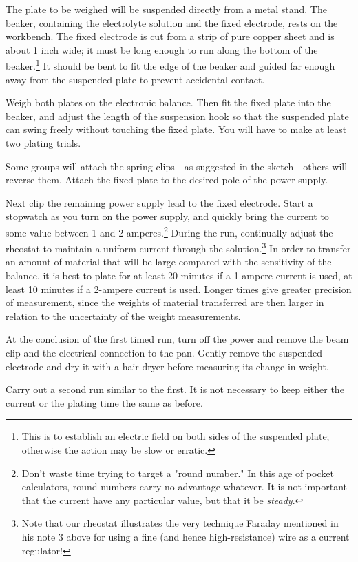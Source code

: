 The plate to be weighed will be suspended directly from a metal stand.
The beaker, containing the electrolyte solution and the fixed electrode,
rests on the workbench. The fixed electrode is cut from a strip of pure
copper sheet and is about 1 inch wide; it must be long enough to run
along the bottom of the beaker.\footnote{This is to establish an
  electric field on both sides of the suspended plate; otherwise the
  action may be slow or erratic.} It should be bent to fit the edge of
the beaker and guided far enough away from the suspended plate to
prevent accidental contact.

Weigh both plates on the electronic balance. Then fit the fixed plate
into the beaker, and adjust the length of the suspension hook so that
the suspended plate can swing freely without touching the fixed plate.
You will have to make at least two plating trials.

Some groups will attach the spring clips---as suggested in the 
sketch---others will reverse them. Attach the fixed plate to the desired pole of
the power supply.

Next clip the remaining power supply lead to the fixed electrode. Start
a stopwatch as you turn on the power supply, and quickly bring the
current to some value between 1 and 2 amperes.\footnote{Don't waste time
  trying to target a "round number." In this age of pocket calculators,
  round numbers carry no advantage whatever. It is not important that
  the current have any particular value, but that it be \emph{steady}.}
During the run, continually adjust the rheostat to maintain a uniform
current through the solution.\footnote{Note that our rheostat
  illustrates the very technique Faraday mentioned in his note 3 
  above for using a fine (and hence high-resistance) wire as a current
  regulator!} In order to transfer an amount of material that will be
large compared with the sensitivity of the balance, it is best to plate
for at least 20 minutes if a 1-ampere current is used, at least 10
minutes if a 2-ampere current is used. Longer times give greater
precision of measurement, since the weights of material transferred are
then larger in relation to the uncertainty of the weight mea\-sure\-ments.

At the conclusion of the first timed run, turn off the power and remove
the beam clip and the electrical connection to the pan. Gently remove
the suspended electrode and dry it with a hair dryer before measuring
its change in weight.

Carry out a second run similar to the first. It is not necessary to keep
either the current or the plating time the same as before.

